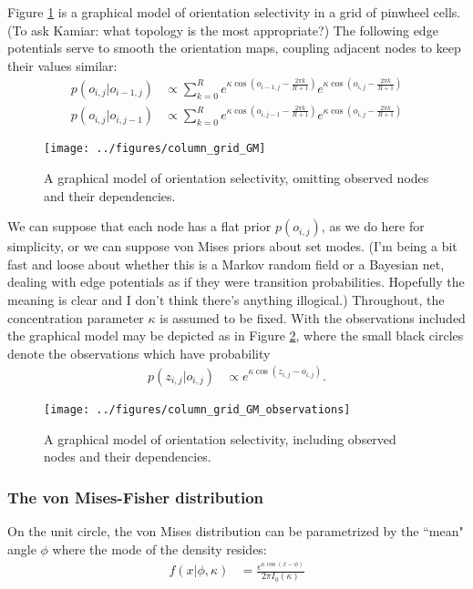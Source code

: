 \documentclass[11pt]{article}
\begin{document}
Figure \ref{fig:som_gm0} is a graphical model of orientation selectivity in a grid of pinwheel cells. (To ask Kamiar: what topology is the most appropriate?) The following edge potentials serve to smooth the orientation maps, coupling adjacent nodes to keep their values similar:
%
\begin{align*}
p(o_{i,j}|o_{i-1,j}) &\propto \sum_{k=0}^R e^{\kappa \cos\left(o_{i-1,j}-\frac{2\pi k}{R+1}\right)} e^{\kappa \cos\left(o_{i,j}-\frac{2\pi k}{R+1}\right)} \\
p(o_{i,j}|o_{i,j-1}) &\propto \sum_{k=0}^R e^{\kappa \cos\left(o_{i,j-1}-\frac{2\pi k}{R+1}\right)} e^{\kappa \cos\left(o_{i,j}-\frac{2\pi k}{R+1}\right)}
\end{align*}
%
\begin{figure}[h]
\centering
\texttt{[image: ../figures/column\_grid\_GM]}
\caption{A graphical model of orientation selectivity, omitting observed nodes and their dependencies.}
\label{fig:som_gm0}
\end{figure}

\noindent We can suppose that each node has a flat prior $p(o_{i,j})$, as we do here for simplicity, or we can suppose von Mises priors about set modes. (I'm being a bit fast and loose about whether this is a Markov random field or a Bayesian net, dealing with edge potentials as if they were transition probabilities. Hopefully the meaning is clear and I don't think there's anything illogical.) Throughout, the concentration parameter $\kappa$ is assumed to be fixed. With the observations included the graphical model may be depicted as in Figure \ref{fig:som_gm2}, where the small black circles denote the observations which have probability
%
\begin{align*}
p(z_{i,j}|o_{i,j}) &\propto e^{\kappa \cos(z_{i,j}-o_{i,j})}.
\end{align*}

\begin{figure}[h]
\centering
\texttt{[image: ../figures/column\_grid\_GM\_observations]}
\caption{A graphical model of orientation selectivity, including observed nodes and their dependencies.}
\label{fig:som_gm2}
\end{figure}

\subsubsection*{The von Mises-Fisher distribution}

On the unit circle, the von Mises distribution can be parametrized by the ``mean" angle $\phi$ where the mode of the density resides:
%
\begin{align*}
f(x|\phi,\kappa) &= \frac{e^{\kappa\cos(x-\phi)}}{2\pi I_0(\kappa)}
\end{align*}
\end{document}
